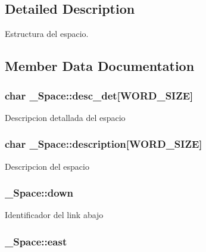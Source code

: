 \subsection{Detailed Description}
Estructura del espacio. 

\subsection{Member Data Documentation}
\hypertarget{struct__Space_aa45e63028e88eb1bbd881c30b9478797}{
\subsubsection[{desc\+\_\+det}]{\setlength{\rightskip}{0pt plus 5cm}char \+\_\+\+Space\+::desc\+\_\+det\mbox{[}{\bf W\+O\+R\+D\+\_\+\+S\+I\+Z\+E}\mbox{]}}}\label{struct__Space_aa45e63028e88eb1bbd881c30b9478797}
Descripcion detallada del espacio \hypertarget{struct__Space_a2a50aacb78d1d0f65f5b14f94ed81d80}{
\subsubsection[{description}]{\setlength{\rightskip}{0pt plus 5cm}char \+\_\+\+Space\+::description\mbox{[}{\bf W\+O\+R\+D\+\_\+\+S\+I\+Z\+E}\mbox{]}}}\label{struct__Space_a2a50aacb78d1d0f65f5b14f94ed81d80}
Descripcion del espacio \hypertarget{struct__Space_ac20194f418676bb03cca7e0fdcb6f559}{
\subsubsection[{down}]{ \+\_\+\+Space\+::down}}\label{struct__Space_ac20194f418676bb03cca7e0fdcb6f559}
Identificador del link abajo \hypertarget{struct__Space_a41ce2bf33cf0c157b358221f094ee05b}{
\subsubsection[{east}]{ \+\_\+\+Space\+::east}}\label{struct__Space_a41ce2bf33cf0c157b358221f094ee05b}
